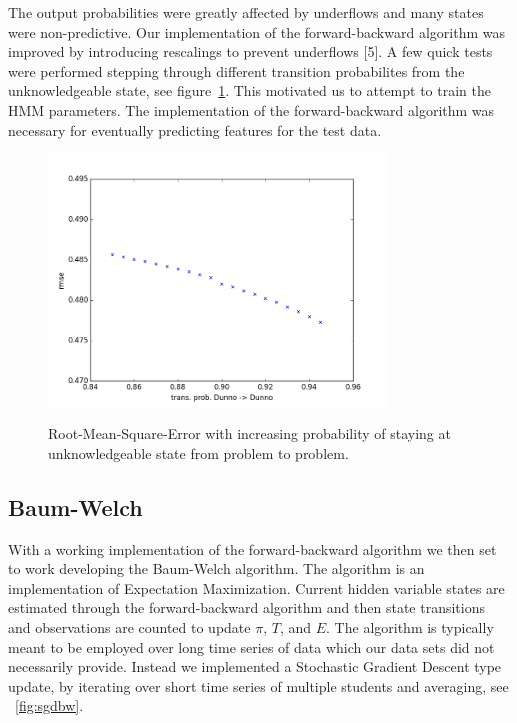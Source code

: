 \documentclass{article} %
\begin{document}
The output probabilities were greatly affected by underflows and many states were non-predictive. Our implementation of the forward-backward algorithm was improved by introducing rescalings to prevent underflows [5]. A few quick tests were performed stepping through different transition probabilites from the unknowledgeable state, see figure~\ref{fig:dunno}. This motivated us to attempt to train the HMM parameters. The implementation of the forward-backward algorithm was necessary for eventually predicting features for the test data.

\begin{figure}[h]
\begin{center}
\includegraphics[width=0.8\textwidth]{dunno.png}
\label{fig:dunno}
\end{center}
\caption{Root-Mean-Square-Error with increasing probability of staying at unknowledgeable state from problem to problem.}
\end{figure}

\subsection{Baum-Welch}
With a working implementation of the forward-backward algorithm we then set to work developing the Baum-Welch algorithm. The algorithm is an implementation of Expectation Maximization. Current hidden variable states are estimated through the forward-backward algorithm and then state transitions and observations are counted to update $\pi$, $T$, and $E$. The algorithm is typically meant to be employed over long time series of data which our data sets did not necessarily provide. Instead we implemented a Stochastic Gradient Descent type update, by iterating over short time series of multiple students and averaging, see ~\ref{fig:sgdbw}.
\end{document}
